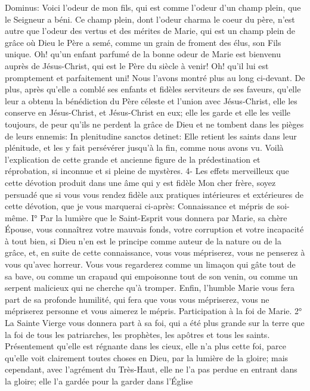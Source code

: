 Dominus: Voici l'odeur de mon fils, qui est comme l'odeur d'un champ plein, que le Seigneur a béni. Ce champ
plein, dont l'odeur charma le coeur du père, n'est autre que l'odeur des vertus et des mérites de Marie, qui est un
champ plein de grâce où Dieu le Père a semé, comme un grain de froment des élus, son Fils unique. Oh! qu'un
enfant parfumé de la bonne odeur de Marie est bienvenu auprès de Jésus-Christ, qui est le Père du siècle à venir!
Oh! qu'il lui est promptement et parfaitement uni! Nous l'avons montré plus au long ci-devant.
 De plus, après qu'elle a comblé ses enfants et fidèles serviteurs de ses faveurs, qu'elle leur a obtenu la
bénédiction du Père céleste et l'union avec Jésus-Christ, elle les conserve en Jésus-Christ, et Jésus-Christ en eux;
elle les garde et elle les veille toujours, de peur qu'ils ne perdent la grâce de Dieu et ne tombent dans les pièges
de leurs ennemis: In plenitudine sanctos detinet: Elle retient les saints dans leur plénitude, et les y fait persévérer
jusqu'à la fin, comme nous avons vu.
Voilà l'explication de cette grande et ancienne figure de la prédestination et réprobation, si inconnue et si pleine de
mystères.
4- Les effets merveilleux que cette dévotion produit
dans une âme qui y est fidèle
 Mon cher frère, soyez persuadé que si vous vous rendez fidèle aux pratiques intérieures et extérieures de
cette dévotion, que je vous marquerai ci-après:
Connaissance et mépris de soi-même.
I° Par la lumière que le Saint-Esprit vous donnera par Marie, sa chère Épouse, vous connaîtrez votre mauvais
fonds, votre corruption et votre incapacité à tout bien, si Dieu n'en est le principe comme auteur de la nature ou de
la grâce, et, en suite de cette connaissance, vous vous mépriserez, vous ne penserez à vous qu'avec horreur.
Vous vous regarderez comme un limaçon qui gâte tout de sa bave, ou comme un crapaud qui empoisonne tout de
son venin, ou comme un serpent malicieux qui ne cherche qu'à tromper. Enfin, l'humble Marie vous fera part de sa
profonde humilité, qui fera que vous vous mépriserez, vous ne mépriserez personne et vous aimerez le mépris.
Participation à la foi de Marie.
 2° La Sainte Vierge vous donnera part à sa foi, qui a été plus grande sur la terre que la foi de tous les
patriarches, les prophètes, les apôtres et tous les saints. Présentement qu'elle est régnante dans les cieux, elle n'a
plus cette foi, parce qu'elle voit clairement toutes choses en Dieu, par la lumière de la gloire; mais cependant, avec
l'agrément du Très-Haut, elle ne l'a pas perdue en entrant dans la gloire; elle l'a gardée pour la garder dans l'Église

